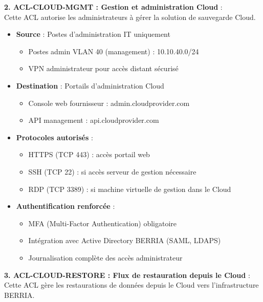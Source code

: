 \newpage

\noindent \textbf{2. ACL-CLOUD-MGMT : Gestion et administration Cloud} :\\
Cette ACL autorise les administrateurs à gérer la solution de sauvegarde Cloud.

\begin{itemize}
  \item \textbf{Source} : Postes d'administration IT uniquement
  \begin{itemize}
    \item Postes admin VLAN 40 (management) : 10.10.40.0/24
    \item VPN administrateur pour accès distant sécurisé
  \end{itemize}
  
  \item \textbf{Destination} : Portails d'administration Cloud
  \begin{itemize}
    \item Console web fournisseur : admin.cloudprovider.com
    \item API management : api.cloudprovider.com
  \end{itemize}
  
  \item \textbf{Protocoles autorisés} :
  \begin{itemize}
    \item HTTPS (TCP 443) : accès portail web
    \item SSH (TCP 22) : si accès serveur de gestion nécessaire
    \item RDP (TCP 3389) : si machine virtuelle de gestion dans le Cloud
  \end{itemize}
  
  \item \textbf{Authentification renforcée} :
  \begin{itemize}
    \item MFA (Multi-Factor Authentication) obligatoire
    \item Intégration avec Active Directory BERRIA (SAML, LDAPS)
    \item Journalisation complète des accès administrateur
  \end{itemize}
\end{itemize}

\medskip

\noindent \textbf{3. ACL-CLOUD-RESTORE : Flux de restauration depuis le Cloud} :\\
Cette ACL gère les restaurations de données depuis le Cloud vers l'infrastructure BERRIA.

